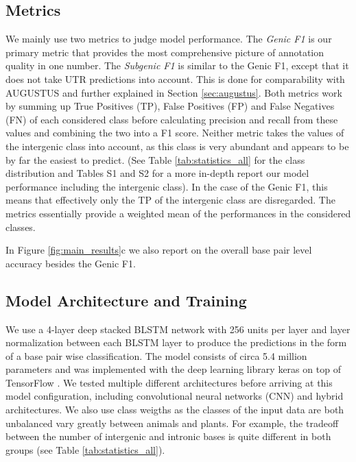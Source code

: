 \documentclass{bioinfo}
\begin{document}
\begin{methods}
\subsection{Metrics}
We mainly use two metrics to judge model performance. The {\it Genic F1} is our 
primary metric that provides the most comprehensive picture of annotation quality 
in one number. The {\it Subgenic F1} is similar to the Genic F1, except that it does 
not take UTR predictions into account. This is done for comparability with AUGUSTUS 
and further explained in Section \ref{sec:augustus}. Both metrics work by summing up 
True Positives (TP), False Positives (FP) and False Negatives (FN) of each 
considered class before calculating precision and recall from these values and 
combining the two into a F1 score. Neither metric takes the values of the 
intergenic class into account, as this class is very abundant and appears to be by 
far the easiest to predict. (See Table \ref{tab:statistics_all} for the class 
distribution and Tables S1 and S2 for a more in-depth report our model performance 
including the intergenic class). In the case of the Genic F1, this means that 
effectively only the TP of the intergenic class are disregarded. The metrics 
essentially provide a weighted mean of the performances in the considered classes. %

In Figure \ref{fig:main_results}c we also report on the overall base pair level 
accuracy besides the Genic F1.

\subsection{Model Architecture and Training}
\label{sec:model}
We use a 4-layer deep stacked BLSTM network with 256 units per layer and layer 
normalization \citep{ba2016layer} between each BLSTM layer to produce the 
predictions in the form of a base pair wise classification. The model consists of 
circa 5.4 million parameters and was implemented with the deep learning library 
keras \citep{chollet2015keras} on top of TensorFlow \citep{abadi2016tensorflow}. We 
tested multiple different architectures before arriving at this model configuration, 
including convolutional neural networks (CNN) and hybrid architectures. We also use 
class weigths as the classes of the input data are both unbalanced vary greatly 
between animals and plants. 
For example, the tradeoff between the number of intergenic and intronic bases is 
quite different in both groups (see Table \ref{tab:statistics_all}). 


\end{methods}
\end{document}
